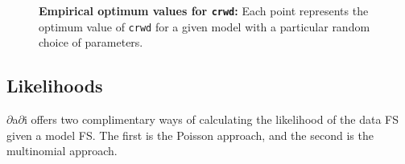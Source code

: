 \documentclass[12pt]{article}
\makeatletter
\newcommand{\dadi}{$\partial$a$\partial$i\xspace}
\newcommand{\py}[1]{\lstinline[language=Python, showstringspaces=False]@#1@}
\makeatother
\begin{document}
\begin{figure}
\centering
{}
\caption{\textbf{Empirical optimum values for \py{crwd}:} Each point represents the optimum value of \py{crwd} for a given model with a particular random choice of parameters.\label{fig:best_crwd}}
\end{figure}

\subsection{Likelihoods}

\dadi offers two complimentary ways of calculating the likelihood of the data FS given a model FS.
The first is the Poisson approach, and the second is the multinomial approach.
\end{document}
